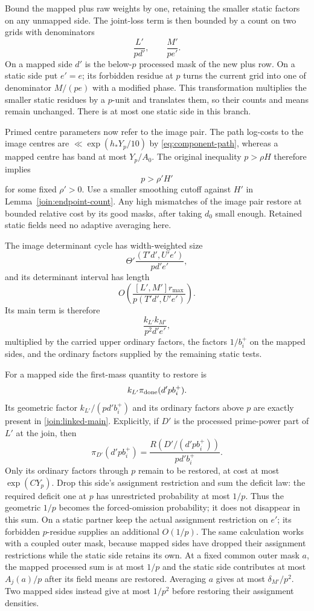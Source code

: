 Bound the mapped plus raw weights by one, retaining the smaller static
factors on any unmapped side. The joint-loss term is then bounded by a
count on two grids with denominators
\[
 \frac{L'}{pd'},\qquad \frac{M'}{pe'}.
\]
On a mapped side $d'$ is the below-$p$ processed mask of the new plus
row. On a static side put $e'=e$; its forbidden residue at $p$ turns
the current grid into one of denominator $M/(pe)$ with a modified
phase. This transformation multiplies the smaller static residues by
a $p$-unit and translates them, so their counts and means remain
unchanged. There is at most one static side in this branch.

Primed centre parameters now refer to the image pair. The
path log-costs to the image centres are
$\ll\exp(h_*Y_p/10)$ by \eqref{eq:component-path}, whereas a mapped
centre has band at most $Y_p/A_0$. The original inequality $p>\rho H$
therefore implies
\[
 p>\rho'H'
\]
for some fixed $\rho'>0$. Use a smaller smoothing cutoff against
$H'$ in Lemma~\ref{join:endpoint-count}. Any high mismatches of the
image pair restore at bounded relative cost by its good masks, after
taking $d_0$ small enough. Retained static fields need no adaptive
averaging here.

The image determinant cycle has width-weighted size
\[
 \Theta'\frac{(T'd',U'e')}{pd'e'},
\]
and its determinant interval has length
\[
 O\left(\frac{[L',M']r_{\max}}
                  {p(T'd',U'e')}\right).
\]
Its main term is therefore
\begin{equation}\label{join:linked-main}
 \frac{k_{L'}k_{M'}}{p^2d'e'},
\end{equation}
multiplied by the carried upper ordinary factors, the factors
$1/b_i^+$ on the mapped sides, and the ordinary factors supplied by
the remaining static tests.

For a mapped side the first-mass quantity to restore is
\[
 k_{L'}\pi_{\rm done}(d'pb_i^+).
\]
Its geometric factor $k_{L'}/(pd'b_i^+)$ and its ordinary factors
above $p$ are exactly present in \eqref{join:linked-main}. Explicitly,
if $D'$ is the processed prime-power part of $L'$ at the join, then
\[
 \pi_{D'}(d'pb_i^+)
 =\frac{R(D'/(d'pb_i^+))}{pd'b_i^+}.
\]
Only its ordinary factors through $p$ remain to be restored, at cost
at most $\exp(CY_p)$. Drop this side's assignment restriction and
sum the deficit law: the required deficit one at $p$ has unrestricted
probability at most $1/p$. Thus the geometric $1/p$ becomes the
forced-omission probability; it does not disappear in this sum. On a
static partner keep the actual assignment restriction on $e'$; its
forbidden $p$-residue supplies an additional $O(1/p)$. The same
calculation works with a coupled outer mask, because mapped sides
have dropped their assignment restrictions while the static side
retains its own. At a fixed common outer mask $a$, the mapped
processed sum is at most $1/p$ and the static side contributes at
most $A_j(a)/p$ after its field means are restored. Averaging $a$
gives at most $\delta_{M'}/p^2$. Two mapped sides instead give
at most $1/p^2$ before restoring their assignment densities.

